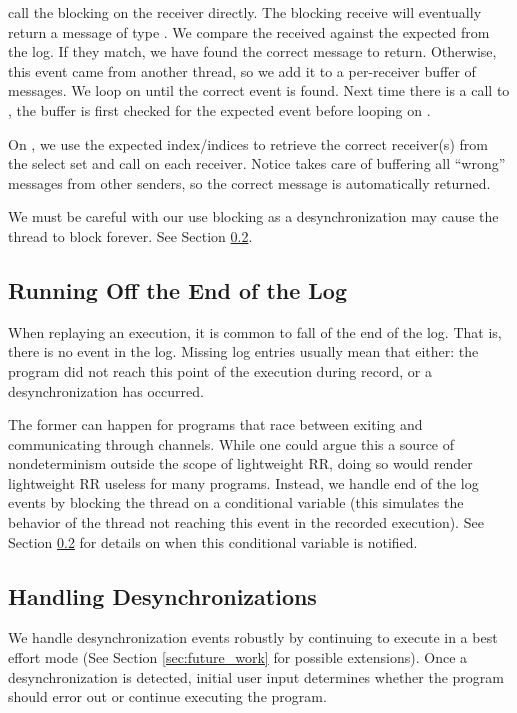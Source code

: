  call the blocking  on the receiver directly.
The blocking receive will eventually return a message of type . We
compare the received  against the expected  from the log.
If they match,
we have found the correct message to return. Otherwise, this event came from another
thread, so we add it to a per-receiver buffer of messages. We loop on 
until the correct event is found. Next time there is a call to ,
the buffer is first checked for the expected event before looping on .

On , we use the expected index/indices to retrieve the correct receiver(s)
from the select set and call  on each receiver. Notice 
takes care of buffering all ``wrong'' messages from other senders, so the correct message
is automatically returned.

We must be careful with our use blocking  as a desynchronization may
cause the thread to block forever. See Section \ref{sec:handle_desync}.

\subsection{Running Off the End of the Log}
When replaying an execution, it is common to fall of the end of the log. That is,
there is no  event in the log. Missing log entries usually mean
that either: the program did not reach this point of the execution during record, or a desynchronization has occurred.

The former can happen for programs that race between exiting and communicating through
channels. While one could argue this a source of nondeterminism outside the scope of
lightweight RR, doing so would render lightweight RR useless for many programs.
Instead, we handle end of the log events by blocking the thread on a conditional
variable (this simulates the behavior of the thread not reaching this event in the recorded execution). See Section \ref{sec:handle_desync} for details on when this conditional variable
is notified.

\subsection{Handling Desynchronizations}
\label{sec:handle_desync}
We handle desynchronization events robustly by continuing to execute in
a best effort mode (See Section \ref{sec:future_work} for possible extensions).
Once a desynchronization is detected, initial user input determines whether the
program should error out or continue executing the program.


